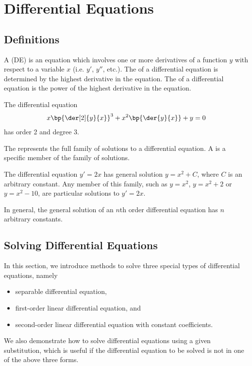\chapter{Differential Equations}

\section{Definitions}

\begin{definition}
    A  (DE) is an equation which involves one or more derivatives of a function $y$ with respect to a variable $x$ (i.e. $y'$, $y''$, etc.). The  of a differential equation is determined by the highest derivative in the equation. The  of a differential equation is the power of the highest derivative in the equation.
\end{definition}

\begin{example}
    The differential equation \[x \bp{\der[2]{y}{x}}^3 + x^2 \bp{\der{y}{x}} + y = 0\] has order 2 and degree 3.
\end{example}

\begin{definition}
    The  represents the full family of solutions to a differential equation. A  is a specific member of the family of solutions.
\end{definition}

\begin{example}
    The differential equation $y' = 2x$ has general solution $y = x^2 + C$, where $C$ is an arbitrary constant. Any member of this family, such as $y = x^2$, $y = x^2 + 2$ or $y = x^2 - 10$, are particular solutions to $y' = 2x$.  
\end{example}

In general, the general solution of an $n$th order differential equation has $n$ arbitrary constants.

\section{Solving Differential Equations}

In this section, we introduce methods to solve three special types of differential equations, namely
\begin{itemize}
    \item separable differential equation,
    \item first-order linear differential equation, and
    \item second-order linear differential equation with constant coefficients.
\end{itemize}
We also demonstrate how to solve differential equations using a given substitution, which is useful if the differential equation to be solved is not in one of the above three forms.

